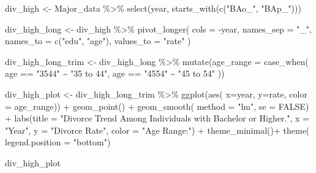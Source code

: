 \documentclass[
]{article}
\newenvironment{Shaded}{\begin{snugshade}}{\end{snugshade}}
\newcommand{\AttributeTok}[1]{\textcolor[rgb]{0.77,0.63,0.00}{#1}}
\newcommand{\ConstantTok}[1]{\textcolor[rgb]{0.00,0.00,0.00}{#1}}
\newcommand{\FunctionTok}[1]{\textcolor[rgb]{0.00,0.00,0.00}{#1}}
\newcommand{\NormalTok}[1]{#1}
\newcommand{\OtherTok}[1]{\textcolor[rgb]{0.56,0.35,0.01}{#1}}
\newcommand{\SpecialCharTok}[1]{\textcolor[rgb]{0.00,0.00,0.00}{#1}}
\newcommand{\StringTok}[1]{\textcolor[rgb]{0.31,0.60,0.02}{#1}}
\begin{document}
\begin{Shaded}
\begin{Highlighting}[]
\NormalTok{div\_high }\OtherTok{\textless{}{-}}\NormalTok{ Major\_data }\SpecialCharTok{\%\textgreater{}\%}
   \FunctionTok{select}\NormalTok{(year, }\FunctionTok{starts\_with}\NormalTok{(}\FunctionTok{c}\NormalTok{(}\StringTok{"BAo\_"}\NormalTok{, }\StringTok{"BAp\_"}\NormalTok{)))}

\NormalTok{div\_high\_long }\OtherTok{\textless{}{-}}\NormalTok{ div\_high }\SpecialCharTok{\%\textgreater{}\%} 
  \FunctionTok{pivot\_longer}\NormalTok{(}
  \AttributeTok{cols =} \SpecialCharTok{{-}}\NormalTok{year,}
  \AttributeTok{names\_sep =} \StringTok{"\_"}\NormalTok{,}
  \AttributeTok{names\_to =} \FunctionTok{c}\NormalTok{(}\StringTok{"edu"}\NormalTok{, }\StringTok{"age"}\NormalTok{),}
  \AttributeTok{values\_to =} \StringTok{"rate"}
\NormalTok{)}


\NormalTok{div\_high\_long\_trim }\OtherTok{\textless{}{-}} 
\NormalTok{  div\_high\_long }\SpecialCharTok{\%\textgreater{}\%} 
  \FunctionTok{mutate}\NormalTok{(}\AttributeTok{age\_range =} \FunctionTok{case\_when}\NormalTok{(}
\NormalTok{    age }\SpecialCharTok{==} \StringTok{"3544"} \SpecialCharTok{\textasciitilde{}} \StringTok{"35 to 44"}\NormalTok{,}
\NormalTok{    age }\SpecialCharTok{==} \StringTok{"4554"} \SpecialCharTok{\textasciitilde{}} \StringTok{"45 to 54"}
\NormalTok{  ))}

\NormalTok{div\_high\_plot }\OtherTok{\textless{}{-}}\NormalTok{ div\_high\_long\_trim }\SpecialCharTok{\%\textgreater{}\%} 
  \FunctionTok{ggplot}\NormalTok{(}\FunctionTok{aes}\NormalTok{(}
    \AttributeTok{x=}\NormalTok{year,}
    \AttributeTok{y=}\NormalTok{rate,}
    \AttributeTok{color =}\NormalTok{ age\_range)) }\SpecialCharTok{+}
  \FunctionTok{geom\_point}\NormalTok{() }\SpecialCharTok{+}
  \FunctionTok{geom\_smooth}\NormalTok{(}
    \AttributeTok{method =} \StringTok{"lm"}\NormalTok{,}
    \AttributeTok{se =} \ConstantTok{FALSE}\NormalTok{) }\SpecialCharTok{+}
  \FunctionTok{labs}\NormalTok{(}\AttributeTok{title =} \StringTok{"Divorce Trend Among Individuals with Bachelor or Higher."}\NormalTok{,}
       \AttributeTok{x =} \StringTok{"Year"}\NormalTok{,}
       \AttributeTok{y =} \StringTok{"Divorce Rate"}\NormalTok{,}
       \AttributeTok{color =} \StringTok{"Age Range:"}\NormalTok{) }\SpecialCharTok{+}
   \FunctionTok{theme\_minimal}\NormalTok{()}\SpecialCharTok{+}
  \FunctionTok{theme}\NormalTok{(}
    \AttributeTok{legend.position =} \StringTok{"bottom"}\NormalTok{)}

\NormalTok{div\_high\_plot}
\end{Highlighting}
\end{Shaded}
\end{document}
